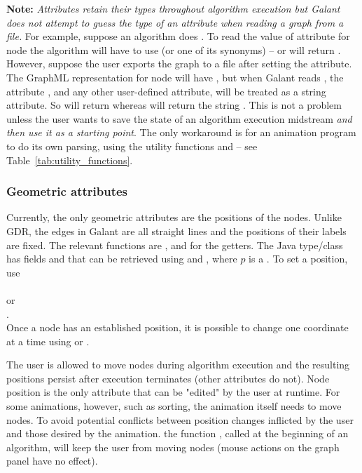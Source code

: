 \textbf{Note:} \emph{Attributes retain their types throughout algorithm
  execution but Galant does not attempt to guess the type of an attribute
  when reading a graph from a file.}
For example, suppose an algorithm does .
To read the value of attribute  for node  the algorithm
will have to use  (or one of its synonyms) --
 or  will return
. 
However, suppose the user exports the graph to a file 
after setting the attribute.
The GraphML representation for node  will have ,
but when Galant reads , the attribute , and any
other user-defined attribute, will be treated as a string attribute. So  
 will return  whereas
 will return the string .
This is not a problem unless the user wants to save the state of an algorithm
execution midstream \emph{and then use it as a starting point}.
The only workaround is for an animation program to do its own parsing, using
the utility functions  and  -- see
Table~\ref{tab:utility_functions}.

\subsubsection{Geometric attributes}

Currently, the only geometric attributes are the positions of the
nodes. 
Unlike GDR, the edges in Galant
are all straight lines and the positions of their labels are fixed.
The relevant functions are
, 
and 
for the getters. The Java type/class  has fields  and
 that can be retrieved using  and , where $p$
is a . To set a position, use\\
\hspace*{2em}\\
or\\
\hspace*{2em}.\\
Once a node has an established position, it is possible to change
one coordinate at a time using  or
.

The user is allowed to move nodes during algorithm execution
and the resulting positions persist after execution terminates
(other attributes do not).
Node position is the only attribute that can be "edited" by the user
at runtime.
For some animations, however, such as sorting,
the animation itself needs to move
nodes.
To avoid potential conflicts between position changes inflicted by the user
and those desired by the animation.
the function , called at the beginning of an algorithm,
will keep the user from moving nodes (mouse actions on the graph panel have
no effect).

